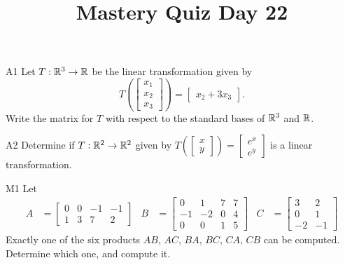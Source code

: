 \documentclass{sbgLAquiz}
\title{Mastery Quiz Day 22 }
\begin{document}
\begin{problem}{A1}
Let $T: \mathbb{R}^3 \rightarrow \mathbb{R}$ be the linear transformation given by $$T\left(\begin{bmatrix} x_1 \\ x_2 \\ x_3  \end{bmatrix} \right) = \begin{bmatrix} x_2+3x_3 \end{bmatrix}.$$ Write the matrix for $T$ with respect to the standard bases of $\mathbb{R}^3$ and $\mathbb{R}$.
\end{problem}

\begin{problem}{A2}
 Determine if $T: \mathbb{R}^2 \rightarrow \mathbb{R}^2$ given by $T\left(\begin{bmatrix} x \\ y \end{bmatrix}\right) = \begin{bmatrix} e^{x} \\ e^y \end{bmatrix}$ is a linear transformation.
\end{problem}
\newpage

\begin{problem}{M1}
Let
\begin{align*}
A &= \begin{bmatrix} 0 & 0 & -1 & -1 \\ 1 & 3 & 7 & 2 \end{bmatrix} & B &= \begin{bmatrix} 0 & 1 & 7 & 7 \\ -1 & -2 & 0 & 4 \\ 0 & 0 & 1 & 5 \end{bmatrix} & C&=\begin{bmatrix} 3 & 2 \\ 0 & 1 \\ -2 & -1 \end{bmatrix}
\end{align*}
Exactly one of the six products $AB$, $AC$, $BA$, $BC$, $CA$, $CB$ can be computed.  Determine which one, and compute it.
\end{problem}
\end{document}
